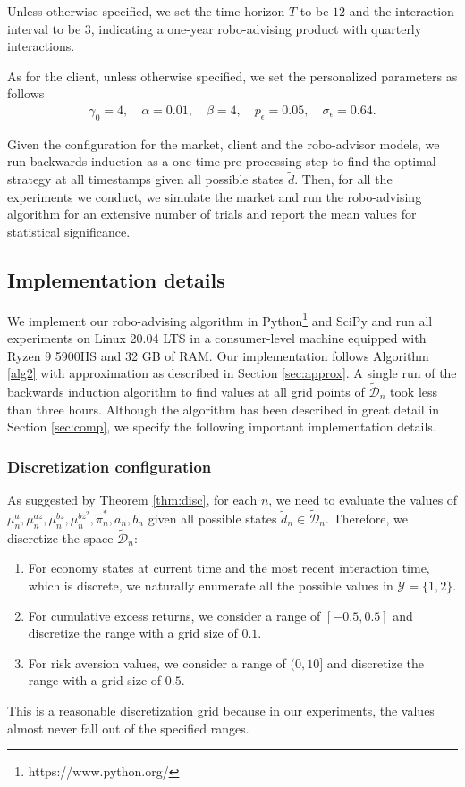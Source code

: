 Unless otherwise specified, we set the time horizon $T$ to be $12$ and the interaction interval to be $3$, indicating a one-year robo-advising product with quarterly interactions.

As for the client, unless otherwise specified, we set the personalized parameters as follows\begin{align*}
    \gamma_0=4,\quad \alpha=0.01,\quad \beta=4,\quad p_\epsilon=0.05,\quad \sigma_\epsilon=0.64.
\end{align*}

Given the configuration for the market, client and the robo-advisor models, we run backwards induction as a one-time pre-processing step to find the optimal strategy at all timestamps given all possible states $\tilde d$. Then, for all the experiments we conduct, we simulate the market and run the robo-advising algorithm for an extensive number of trials and report the mean values for statistical significance.

\subsection{Implementation details}\label{sec:impl}
We implement our robo-advising algorithm in Python\footnote{https://www.python.org/} and SciPy \cite{2020SciPy} and run all experiments on Linux 20.04 LTS in a consumer-level machine equipped with Ryzen 9 5900HS and 32 GB of RAM. Our implementation follows Algorithm \ref{alg2} with approximation as described in Section \ref{sec:approx}. A single run of the backwards induction algorithm to find values at all grid points of $\tilde{\mathcal{D}}_n$ took less than three hours. Although the algorithm has been described in great detail in Section \ref{sec:comp}, we specify the following important implementation details.

\subsubsection{Discretization configuration}
As suggested by Theorem \ref{thm:disc}, for each $n$, we need to evaluate the values of $\mu_n^a,\mu_n^{az},\mu_n^{bz},\mu_n^{bz^2},\tilde\pi_n^*,\allowbreak a_n,b_n$ given all possible states $\tilde d_n\in\tilde{\mathcal D}_n$. Therefore, we discretize the space $\tilde{\mathcal D}_n$:\begin{enumerate}
    \item For economy states at current time and the most recent interaction time, which is discrete, we naturally enumerate all the possible values in $\mathcal Y=\{1,2\}$.
    \item For cumulative excess returns, we consider a range of $[-0.5,0.5]$ and discretize the range with a grid size of $0.1$.
    \item For risk aversion values, we consider a range of $(0,10]$ and discretize the range with a grid size of $0.5$.
\end{enumerate} This is a reasonable discretization grid because in our experiments, the values almost never fall out of the specified ranges.

